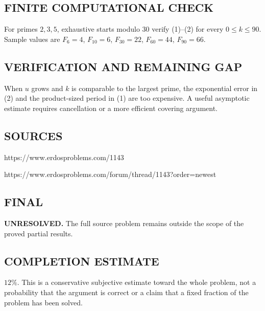 \subsection*{FINITE COMPUTATIONAL CHECK}
For primes $2,3,5$, exhaustive starts modulo 30 verify (1)--(2) for every $0\le k\le90$. Sample values are $F_{6}=4$, $F_{10}=6$, $F_{30}=22$, $F_{60}=44$, $F_{90}=66$.

\subsection*{VERIFICATION AND REMAINING GAP}
When $u$ grows and $k$ is comparable to the largest prime, the exponential
error in (2) and the product-sized period in (1) are too expensive. A useful
asymptotic estimate requires cancellation or a more efficient covering argument.

\subsection*{SOURCES}
https://www.erdosproblems.com/1143

https://www.erdosproblems.com/forum/thread/1143?order=newest

\subsection*{FINAL}
\textbf{UNRESOLVED.} The full source problem remains outside the scope of the proved partial results.

\subsection*{COMPLETION ESTIMATE}
$12\%$. This is a conservative subjective estimate toward the whole problem, not a probability that the argument is correct or a claim that a fixed fraction of the problem has been solved.
